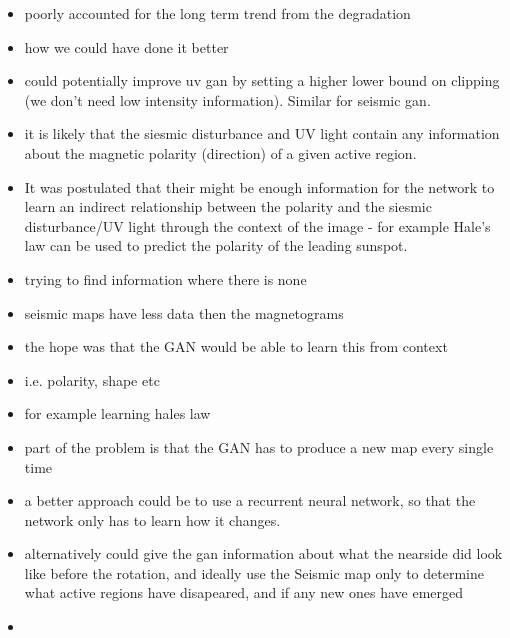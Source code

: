 \documentclass[11pt,a4paper,onecolumn]{report}
\begin{document}
\begin{itemize}
  \item poorly accounted for the long term trend from the degradation
  \item how we could have done it better
  \item could potentially improve uv gan by setting a higher lower bound on
  clipping (we don't need low intensity information). Similar for seismic gan.

  \item it is likely that the siesmic disturbance and UV light contain any
  information about the magnetic polarity (direction) of a given active region.
  \item It was postulated that their might be enough information for the network
  to learn an indirect relationship between the polarity and the siesmic
  disturbance/UV light through the context of the image - for example Hale's law
  can be used to predict the polarity of the leading sunspot.

  \item trying to find information where there is none
  \item seismic maps have less data then the magnetograms
  \item the hope was that the GAN would be able to learn this from context
  \item i.e. polarity, shape etc 
  \item for example learning hales law
  \item part of the problem is that the GAN has to produce a new map every
  single time
  \item a better approach could be to use a recurrent neural network, so that
  the network only has to learn how it changes.
  \item alternatively could give the gan information about what the nearside did look
  like before the rotation, and ideally use the Seismic map only to determine
  what active regions have disapeared, and if any new ones have emerged
  \item 
\end{itemize}



\end{document}
